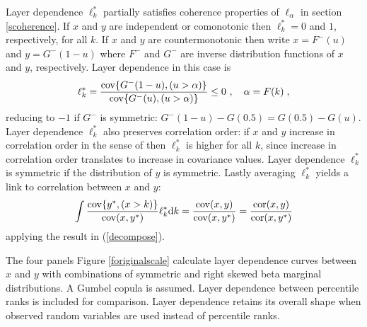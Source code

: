 \documentclass[authoryear]{elsarticle}
\newcommand{\cov}{{\rm cov}}
\newcommand{\cor}{\mathrm{cor}}
\newcommand{\de}{\mathrm{d}}
\newcommand{\cq}{\ ,\quad }
\newcommand{\eref}[1]{(\ref{#1})}
\newcommand{\fref}[1]{Figure \ref{#1}}
\newcommand{\aref}[1]{\ref{#1}}
\begin{document}
Layer dependence $\ell_k^*$ partially satisfies coherence properties of $\ell_\alpha$ in section \aref{scoherence}. If $x$ and $y$ are independent or comonotonic then $\ell_k^*=0$ and $1$, respectively, for all $k$. If $x$ and $y$ are countermonotonic then write $x=F^-(u)$ and $y=G^-(1-u)$ where $F^-$ and $G^-$ are inverse distribution functions of $x$ and $y$, respectively. Layer dependence in this case is
$$
\ell_k^*  =\frac{\cov\{G^-(1-u),(u>\alpha)\}}{\cov\{G^-(u),(u>\alpha)\}} \leq 0 \cq \alpha=F(k) \;,
$$
reducing to $-1$ if $G^-$ is symmetric: $G^-(1-u)-G(0.5)=G(0.5)-G(u)$. Layer dependence $\ell_k^*$ also preserves correlation order: if $x$ and $y$ increase in correlation order in the sense of \cite{dhaene2009correlation} then $\ell_k^*$ is higher for all $k$, since increase in correlation order translates to increase in covariance values. Layer dependence $\ell_k^*$ is symmetric if the distribution of $y$ is symmetric. Lastly averaging $\ell_k^*$ yields a link to correlation between $x$ and $y$:
$$
\int \frac{\cov\{y^*,(x>k)\}}{\cov(x,y^*)} \ell^*_k \de k = \frac{\cov(x,y)}{\cov(x,y^*)} = \frac{\cor(x,y)}{\cor(x,y^*)}
$$
applying the result in \eref{decompose}.

The four panels \fref{foriginalscale} calculate layer dependence curves between $x$ and $y$ with combinations of symmetric and right skewed beta marginal distributions. A Gumbel copula is assumed. Layer dependence between percentile ranks is included for comparison. Layer dependence retains its overall shape when observed random variables are used instead of percentile ranks.
\end{document}
